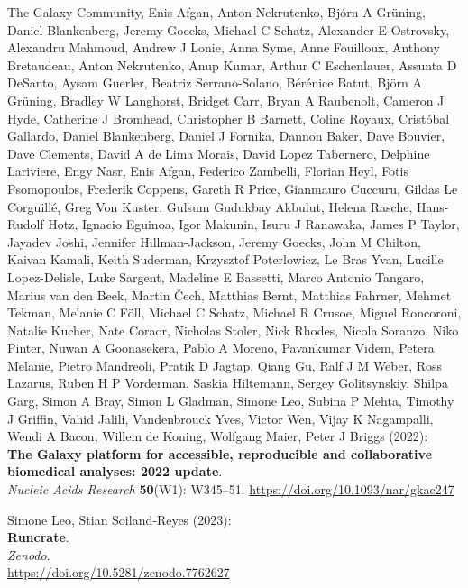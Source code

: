 \documentclass[10pt,letterpaper]{article}
\begin{document}
\begin{thebibliography}{10}
\begin{small}
The Galaxy Community, Enis Afgan, Anton Nekrutenko, Bjórn A Grüning, Daniel Blankenberg, Jeremy Goecks, Michael C Schatz, Alexander E Ostrovsky, Alexandru Mahmoud, Andrew J Lonie, Anna Syme, Anne Fouilloux, Anthony Bretaudeau, Anton Nekrutenko, Anup Kumar, Arthur C Eschenlauer, Assunta D DeSanto, Aysam Guerler, Beatriz Serrano-Solano, Bérénice Batut, Björn A Grüning, Bradley W Langhorst, Bridget Carr, Bryan A Raubenolt, Cameron J Hyde, Catherine J Bromhead, Christopher B Barnett, Coline Royaux, Cristóbal Gallardo, Daniel Blankenberg, Daniel J Fornika, Dannon Baker, Dave Bouvier, Dave Clements, David A de Lima Morais, David Lopez Tabernero, Delphine Lariviere, Engy Nasr, Enis Afgan, Federico Zambelli, Florian Heyl, Fotis Psomopoulos, Frederik Coppens, Gareth R Price, Gianmauro Cuccuru, Gildas Le Corguillé, Greg Von Kuster, Gulsum Gudukbay Akbulut, Helena Rasche, Hans-Rudolf Hotz, Ignacio Eguinoa, Igor Makunin, Isuru J Ranawaka, James P Taylor, Jayadev Joshi, Jennifer Hillman-Jackson, Jeremy Goecks, John M Chilton, Kaivan Kamali, Keith Suderman, Krzysztof Poterlowicz, Le Bras Yvan, Lucille Lopez-Delisle, Luke Sargent, Madeline E Bassetti, Marco Antonio Tangaro, Marius van den Beek, Martin Čech, Matthias Bernt, Matthias Fahrner, Mehmet Tekman, Melanie C Föll, Michael C Schatz, Michael R Crusoe, Miguel Roncoroni, Natalie Kucher, Nate Coraor, Nicholas Stoler, Nick Rhodes, Nicola Soranzo, Niko Pinter, Nuwan A Goonasekera, Pablo A Moreno, Pavankumar Videm, Petera Melanie, Pietro Mandreoli, Pratik D Jagtap, Qiang Gu, Ralf J M Weber, Ross Lazarus, Ruben H P Vorderman, Saskia Hiltemann, Sergey Golitsynskiy, Shilpa Garg, Simon A Bray, Simon L Gladman, Simone Leo, Subina P Mehta, Timothy J Griffin, Vahid Jalili, Vandenbrouck Yves, Victor Wen, Vijay K Nagampalli, Wendi A Bacon, Willem de Koning, Wolfgang Maier, Peter J Briggs (2022):\\
\textbf{The Galaxy platform for accessible, reproducible and collaborative biomedical analyses: 2022 update}.\\
\emph{Nucleic Acids Research} \textbf{50}(W1): W345--51.
\url{https://doi.org/10.1093/nar/gkac247}



Simone Leo, Stian Soiland-Reyes (2023):\\
\textbf{Runcrate}.\\
\emph{Zenodo}.\\
\url{https://doi.org/10.5281/zenodo.7762627}




\end{small}
\end{thebibliography}
\end{document}
